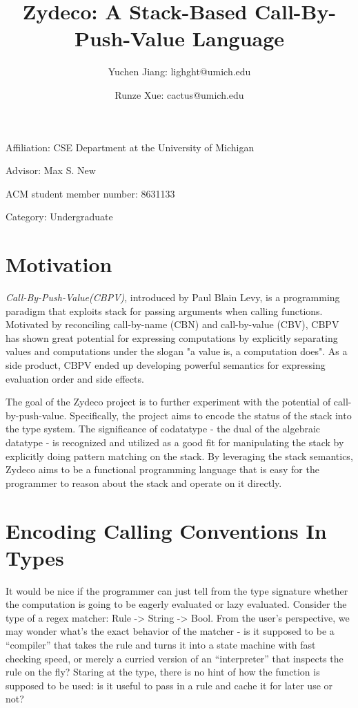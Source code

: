 \documentclass[acmsmall,nonacm]{acmart}
\title{Zydeco: A Stack-Based Call-By-Push-Value Language}
\author{Yuchen Jiang: lighght@umich.edu}
\author{Runze Xue: cactus@umich.edu}
\begin{document}
\renewcommand{\thesection}{\Alph{section}}
\maketitle
\noindent
Affiliation: CSE Department at the University of Michigan

\noindent
Advisor: Max S. New

\noindent
ACM student member number: 8631133

\noindent
Category: Undergraduate

\section{Motivation}

\textit{Call-By-Push-Value(CBPV)}, introduced by Paul Blain Levy, is a programming paradigm that exploits stack for passing arguments when calling functions. Motivated by reconciling call-by-name (CBN) and call-by-value (CBV), CBPV has shown great potential for expressing computations by explicitly separating values and computations under the slogan "a value is, a computation does". As a side product, CBPV ended up developing powerful semantics for expressing evaluation order and side effects.

The goal of the Zydeco project is to further experiment with the potential of call-by-push-value. Specifically, the project aims to encode the status of the stack into the type system. The significance of codatatype - the dual of the algebraic datatype - is recognized and utilized as a good fit for manipulating the stack by explicitly doing pattern matching on the stack. By leveraging the stack semantics, Zydeco aims to be a functional programming language that is easy for the programmer to reason about the stack and operate on it directly.

\section{Encoding Calling Conventions In Types}

It would be nice if the programmer can just tell from the type signature whether the computation is going to be eagerly evaluated or lazy evaluated. Consider the type of a regex matcher: Rule -> String -> Bool. From the user's perspective, we may wonder what's the exact behavior of the matcher - is it supposed to be a ``compiler'' that takes the rule and turns it into a state machine with fast checking speed, or merely a curried version of an ``interpreter'' that inspects the rule on the fly? Staring at the type, there is no hint of how the function is supposed to be used: is it useful to pass in a rule and cache it for later use or not?
\end{document}
